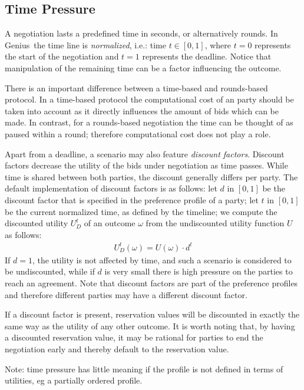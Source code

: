 \documentclass[]{llncs}
\newcommand\Genius{{\sc Genius}}
\begin{document}
\subsection{Time Pressure}
A negotiation lasts a predefined time in seconds, or alternatively rounds. In {\Genius}~the time line is \emph{normalized}, i.e.: time $t \in [0, 1]$, where $t = 0$ represents the start of the negotiation and $t = 1$ represents the deadline. Notice that manipulation of the remaining time can be a factor influencing the outcome.

There is an important difference between a time-based and rounds-based protocol. In a time-based protocol the computational cost of an party should be taken into account as it directly influences the amount of bids which can be made. In contrast, for a rounds-based negotiation the time can be thought of as paused within a round; therefore computational cost does not play a role.

Apart from a deadline, a scenario may also feature \emph{discount factors}. Discount factors decrease the utility of the bids under negotiation as time passes. While time is shared between both parties, the discount generally differs per party. 
The default implementation of discount factors is as follows: let $d$ in $[0, 1]$ be the discount factor that is specified in the preference profile of a party; let $t$ in $[0, 1]$ be the current normalized time, as defined by the timeline; we compute the discounted utility $U_D^t$ of an outcome $\omega$ from the undiscounted utility function $U$ as follows:
\begin{eqnarray}
U_D^t(\omega) = U(\omega) \cdot d^t
\end{eqnarray}
If $d = 1$, the utility is not affected by time, and such a scenario is considered to be undiscounted, while if $d$ is very small there is high pressure on the parties to reach an agreement. Note that discount factors are part of the preference profiles and therefore different parties may have a different discount factor.

If a discount factor is present, reservation values will be discounted in exactly the same way as the utility of any other outcome. It is worth noting that, by having a discounted reservation value, it may be rational for parties to end the negotiation early and thereby default to the reservation value.

Note: time pressure has little meaning if the profile is not defined in terms of utilities, eg a partially ordered profile.
 
\end{document}
